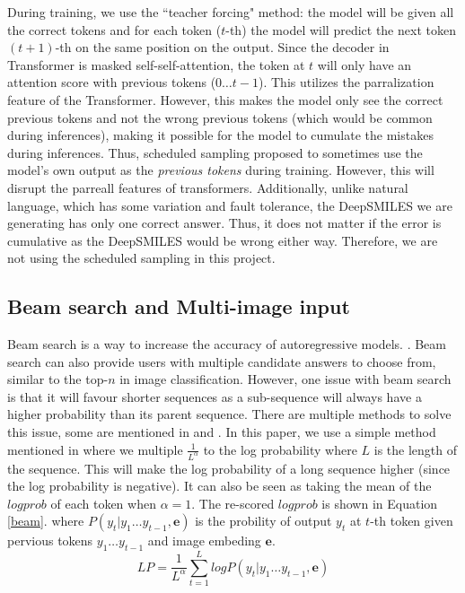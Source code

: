 \documentclass[12pt]{article}
\begin{document}
During training, we use the ``teacher forcing" method: the model will be given all the correct tokens and for each token ($t$-th) the model will predict the next token $(t+1)$-th on the same position on the output. Since the decoder in Transformer is masked self-self-attention, the token at $t$ will only have an attention score with previous tokens ($0\dots t-1$). This utilizes the parralization feature of the Transformer. However, this makes the model only see the correct previous tokens and not the wrong previous tokens (which would be common during inferences), making it possible for the model to cumulate the mistakes during inferences. \autocite{bengio_scheduled_2015} Thus, scheduled sampling \autocite{bengio_scheduled_2015} proposed to sometimes use the model's own output as the \textit{previous tokens} during training. However, this will disrupt the parreall features of transformers. Additionally, unlike natural language, which has some variation and fault tolerance, the DeepSMILES we are generating has only one correct answer. Thus, it does not matter if the error is cumulative as the DeepSMILES would be wrong either way. Therefore, we are not using the scheduled sampling in this project. 

\subsection{Beam search and Multi-image input}
Beam search is a way to increase the accuracy of autoregressive models. \autocite{yang_breaking_2018} \autocite{zhang_beam_2024}. Beam search can also provide users with multiple candidate answers to choose from, similar to the top-$n$ in image classification. However, one issue with beam search is that it will favour shorter sequences as a sub-sequence will always have a higher probability than its parent sequence. \autocite{yang_breaking_2018} \autocite{zhang_beam_2024} There are multiple methods to solve this issue, some are mentioned in \autocite{yang_breaking_2018} and \autocite{zhang_beam_2024}. In this paper, we use a simple method mentioned in \autocite{zhang_beam_2024} where we multiple $\frac{1}{L^\alpha}$ to the log probability where $L$ is the length of the sequence. This will make the log probability of a long sequence higher (since the log probability is negative). It can also be seen as taking the mean of the $logprob$ of each token when $\alpha=1$. The re-scored $logprob$ is shown in Equation \ref{beam}.\cite{zhang_beam_2024} where $P(y_t|y_1\dots y_{t-1}, \textbf{e})$ is the probility of output $y_t$ at $t$-th token given pervious tokens $y_1\dots y_{t-1}$ and image embeding $\textbf{e}$. 
\begin{equation}
    LP = \frac{1}{L^{\alpha}}\sum_{t=1}^{L}logP(y_t|y_1\dots y_{t-1}, \textbf{e})
    \label{beam}
\end{equation}
\end{document}
